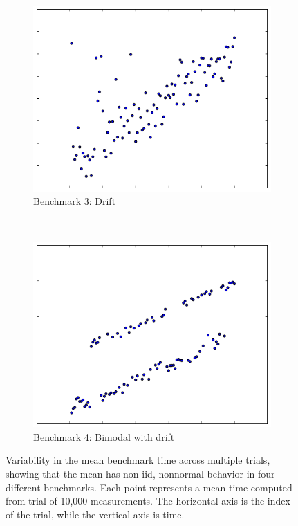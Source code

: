 \documentclass[conference]{IEEEtran}
\begin{document}
\begin{figure}
\begin{subfigure}{0.22\textwidth}
    \centering
    \includegraphics[width=\textwidth]{figures/fig1/drift_manyallocs_slow}
    \caption{Benchmark 3: Drift}
\end{subfigure}
~
\begin{subfigure}{0.22\textwidth}
    \centering
    \includegraphics[width=\textwidth]{figures/fig1/bimodal_drift_sumindex}
    \caption{Benchmark 4: Bimodal with drift}
\end{subfigure}
\caption{Variability in the mean benchmark time across multiple trials, showing
that the mean has non-iid, nonnormal behavior in four different benchmarks.
Each point represents a mean time computed from trial of 10,000 measurements.
The horizontal axis is the index of the trial, while the vertical axis is time.}
\label{fig:meandistributions}
\end{figure}
\end{document}
